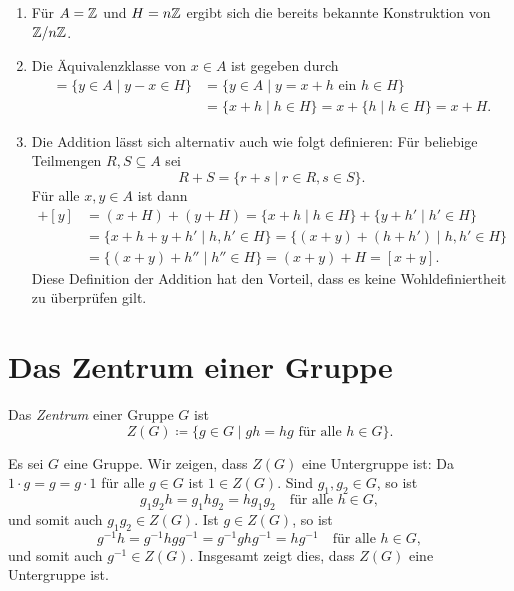 \begin{bem}
 \begin{enumerate}[leftmargin=*]
  \item
   Für $A = \mathbb{Z}$ und $H = n\mathbb{Z}$ ergibt sich die bereits bekannte Konstruktion von $\mathbb{Z}/n\mathbb{Z}$.
  \item
   Die Äquivalenzklasse von $x \in A$ ist gegeben durch
   \begin{align*}
    [x]
    = \{y \in A \mid y-x \in H\}
    &= \{y \in A \mid \text{$y = x + h$ ein $h \in H$}\} \\
    &= \{x+h \mid h \in H\}
    = x + \{h \mid h \in H\}
    = x + H.
   \end{align*}
  \item
   Die Addition lässt sich alternativ auch wie folgt definieren: Für beliebige Teilmengen $R, S \subseteq A$ sei
   \[
    R + S = \{r+s \mid r \in R, s \in S\}.
   \]
   Für alle $x,y \in A$ ist dann
   \begin{align*}
    [x] + [y]
    &= (x+H) + (y+H)
    = \{x+h \mid h \in H\} + \{y+h' \mid h' \in H\} \\
    &= \{x+h+y+h' \mid h, h' \in H\}
    = \{(x+y)+(h+h') \mid h,h' \in H\} \\
    &= \{(x+y)+h'' \mid h'' \in H\}
    = (x+y)+H
    = [x+y].
   \end{align*}
   Diese Definition der Addition hat den Vorteil, dass es keine Wohldefiniertheit zu überprüfen gilt.
 \end{enumerate}
\end{bem}





\section{Das Zentrum einer Gruppe}
\begin{defi}
 Das \emph{Zentrum} einer Gruppe $G$ ist
 \[
  Z(G) \coloneqq \{g \in G \mid \text{$gh = hg$ für alle $h \in G$}\}.
 \]
\end{defi}

Es sei $G$ eine Gruppe. Wir zeigen, dass $Z(G)$ eine Untergruppe ist: Da $1 \cdot g = g = g \cdot 1$ für alle $g \in G$ ist $1 \in Z(G)$. Sind $g_1, g_2 \in G$, so ist
\[
 g_1 g_2 h
 = g_1 h g_2
 = h g_1 g_2
 \quad
 \text{für alle $h \in G$},
\]
und somit auch $g_1 g_2 \in Z(G)$. Ist $g \in Z(G)$, so ist
\[
 g^{-1} h
 = g^{-1} h g g^{-1}
 = g^{-1} g h g^{-1}
 = h g^{-1}
 \quad
 \text{für alle $h \in G$},
\]
und somit auch $g^{-1} \in Z(G)$. Insgesamt zeigt dies, dass $Z(G)$ eine Untergruppe ist.

